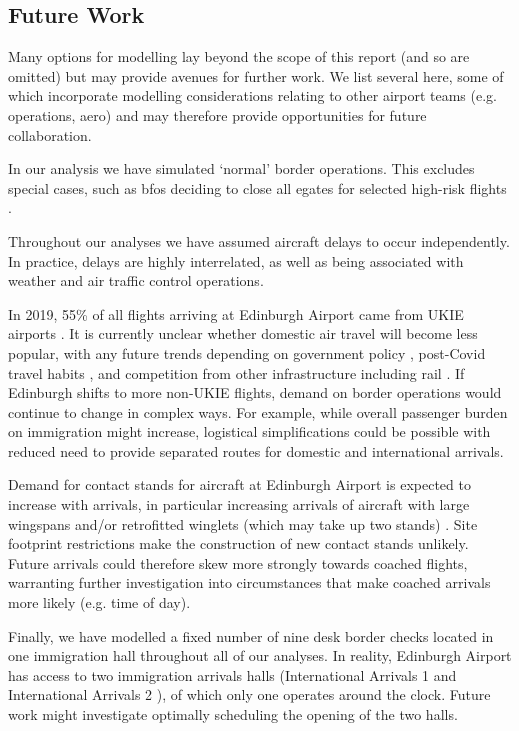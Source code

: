 \documentclass[10pt]{article}
\begin{document}
\vspace{10pt}
\newpage
\subsection{Future Work}
Many options for modelling lay beyond the scope of this report (and so are omitted) but may provide avenues for further work. We list several here, some of which incorporate modelling considerations relating to other airport teams (e.g. operations, aero) and may therefore provide opportunities for future collaboration.

In our analysis we have simulated `normal' border operations. This excludes special cases, such as \glspl{bfo} deciding to close all \glspl{egate} for selected high-risk flights \cite{Inspection_eGates}.  

Throughout our analyses we have assumed aircraft delays to occur independently. In practice, delays are highly interrelated, as well as being associated with weather and air traffic control operations.

In 2019, 55\% of all flights arriving at Edinburgh Airport came from UKIE airports \cite{noise_lab}. It is currently unclear whether domestic air travel will become less popular, with any future trends depending on government policy \cite{flight_tax_independent}, post-Covid travel habits \cite{post_covid_flights}, and competition from other infrastructure including rail \cite{train_airplane_guardian}. If Edinburgh shifts to more non-UKIE flights, demand on border operations would continue to change in complex ways. For example, while overall passenger burden on immigration might increase, logistical simplifications could be possible with reduced need to provide separated routes for domestic and international arrivals.

Demand for contact stands for aircraft at Edinburgh Airport is expected to increase with arrivals, in particular increasing arrivals of aircraft with large wingspans and/or retrofitted winglets (which may take up two stands) \cite{dijk2019recoverable}. Site footprint restrictions make the construction of new contact stands unlikely. Future arrivals could therefore skew more strongly towards coached flights, warranting further investigation into circumstances that make coached arrivals more likely (e.g. time of day). 

Finally, we have modelled a fixed number of nine desk border checks located in one immigration hall throughout all of our analyses. In reality, Edinburgh Airport has access to two immigration arrivals halls (International Arrivals 1 and International Arrivals 2 \cite{international_arrivals}), of which only one operates around the clock. Future work might investigate optimally scheduling the opening of the two halls.
\end{document}
